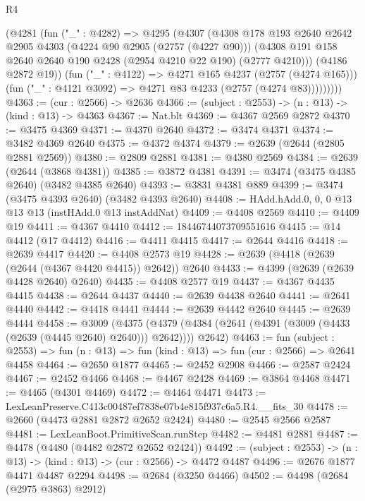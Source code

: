 \begin{lexlean}{R4}
\begin{coremodule}
            (@4281
              (fun ("_" : @4282) =>
              @4295
                (@4307
                  (@4308
                    @178
                    @193
                    @2640
                    @2642
                    @2905
                    @4303
                    (@4224 @90 @2905 (@2757 (@4227 @90)))
                    (@4308 @191 @158 @2640 @2640 @190 @2428 (@2954 @4210 @22 @190) (@2777 @4210)))
                  (@4186 @2872 @19))
                (fun ("_" : @4122) => @4271 @165 @4237 (@2757 (@4274 @165)))
                (fun ("_" : @4121 @3092) => @4271 @83 @4233 (@2757 (@4274 @83)))))))))
@4363 := (cur : @2566) -> @2636
@4366 := (subject : @2553) -> (n : @13) -> (kind : @13) -> @4363
@4367 := Nat.blt
@4369 := @4367 @2569 @2872
@4370 := @3475 @4369
@4371 := @4370 @2640
@4372 := @3474 @4371
@4374 := @3482 @4369 @2640
@4375 := @4372 @4374
@4379 := @2639 (@2644 (@2805 @2881 @2569))
@4380 := @2809 @2881
@4381 := @4380 @2569
@4384 := @2639 (@2644 (@3868 @4381))
@4385 := @3872 @4381
@4391 := @3474 (@3475 @4385 @2640) (@3482 @4385 @2640)
@4393 := @3831 @4381 @889
@4399 := @3474 (@3475 @4393 @2640) (@3482 @4393 @2640)
@4408 := HAdd.hAdd.{0, 0, 0} @13 @13 @13 (instHAdd.{0} @13 instAddNat)
@4409 := @4408 @2569
@4410 := @4409 @19
@4411 := @4367 @4410
@4412 := 18446744073709551616
@4415 := @14 @4412 (@17 @4412)
@4416 := @4411 @4415
@4417 := @2644 @4416
@4418 := @2639 @4417
@4420 := @4408 @2573 @19
@4428 := @2639 (@4418 (@2639 (@2644 (@4367 @4420 @4415)) @2642)) @2640
@4433 := @4399 (@2639 (@2639 @4428 @2640) @2640)
@4435 := @4408 @2577 @19
@4437 := @4367 @4435 @4415
@4438 := @2644 @4437
@4440 := @2639 @4438 @2640
@4441 := @2641 @4440
@4442 := @4418 @4441
@4444 := @2639 @4442 @2640
@4445 := @2639 @4444
@4458 := @3009
    (@4375 (@4379 (@4384 (@2641 (@4391 (@3009 (@4433 (@2639 (@4445 @2640) @2640))) @2642)))) @2642)
@4463 := fun (subject : @2553) =>
  fun (n : @13) => fun (kind : @13) => fun (cur : @2566) => @2641 @4458
@4464 := @2650 @1877
@4465 := @2452 @2908
@4466 := @2587 @2424
@4467 := @2452 @4466
@4468 := @4467 @2428
@4469 := @3864 @4468
@4471 := @4465 (@4301 @4469)
@4472 := @4464 @4471
@4473 := LexLeanPreserve.C413c00487ef7838e07b4e815f937c6a5.R4.__fits_30
@4478 := @2660 (@4473 @2881 @2872 @2652 @2424)
@4480 := @2545 @2566 @2587
@4481 := LexLeanBoot.PrimitiveScan.runStep
@4482 := @4481 @2881
@4487 := @4478 (@4480 (@4482 @2872 @2652 @2424))
@4492 := (subject : @2553) -> (n : @13) -> (kind : @13) -> (cur : @2566) -> @4472 @4487
@4496 := @2676 @1877 @4471 @4487 @2294
@4498 := @2684 (@3250 @4466)
@4502 := @4498 (@2684 (@2975 @3863) @2912)

\end{coremodule}
\end{lexlean}
